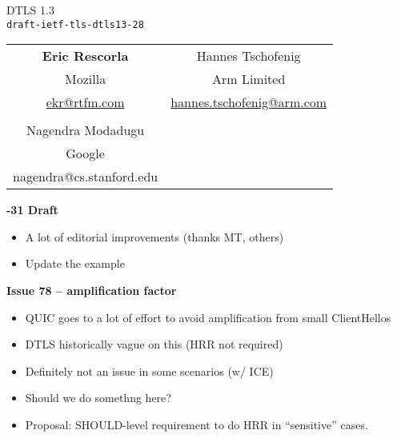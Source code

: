 \documentclass[helvetica]{seminar}
\newcommand{\heading}[1]{%
  \begin{center} 
    \large\bf 
    #1 
  \end{center} 
  \vspace{.4 in}}
\begin{document}
\begin{slide}
\begin{center}
\vspace{.5 in}
\LARGE{{\bf}DTLS 1.3\\{\small \verb^draft-ietf-tls-dtls13-28^}}\\
\vspace{.2in}
{\small
\begin{tabular}{c c}
\textbf{Eric Rescorla} & Hannes Tschofenig \\
Mozilla& Arm Limited \\ 
  \url{ekr@rtfm.com} & \url{hannes.tschofenig@arm.com} \\
  \\
  Nagendra Modadugu \\
  Google \\
  nagendra@cs.stanford.edu \\
  \end{tabular}

}

\end{center}
\end{slide}

\centerslidesfalse 

\begin{slide}
  \heading{-31 Draft}

  \begin{itemize}
  \item A lot of editorial improvements (thanks MT, others)
  \item Update the example
\end{itemize}
\end{slide}

\begin{slide}
  \heading{Issue 78 -- amplification factor}

  \begin{itemize}
  \item QUIC goes to a lot of effort to avoid amplification from small ClientHellos
  \item DTLS historically vague on this (HRR not required)
  \item Definitely not an issue in some scenarios (w/ ICE)
  \item Should we do somethng here?
  \item Proposal: SHOULD-level requirement to do HRR in ``sensitive'' cases.
  \end{itemize}
\end{slide}
\end{document}
